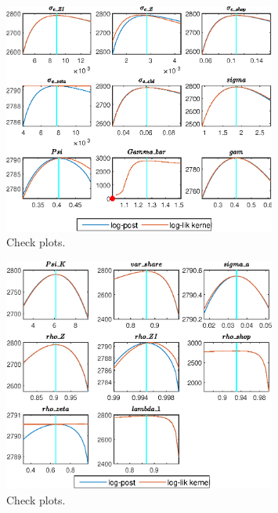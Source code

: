  
\begin{figure}[H]
\centering 
\includegraphics[width=0.80\textwidth]{directed_search/graphs/directed_search_CheckPlots1}
\caption{Check plots.}\label{Fig:CheckPlots:1}
\end{figure}
 
\begin{figure}[H]
\centering 
\includegraphics[width=0.80\textwidth]{directed_search/graphs/directed_search_CheckPlots2}
\caption{Check plots.}\label{Fig:CheckPlots:2}
\end{figure}
 
